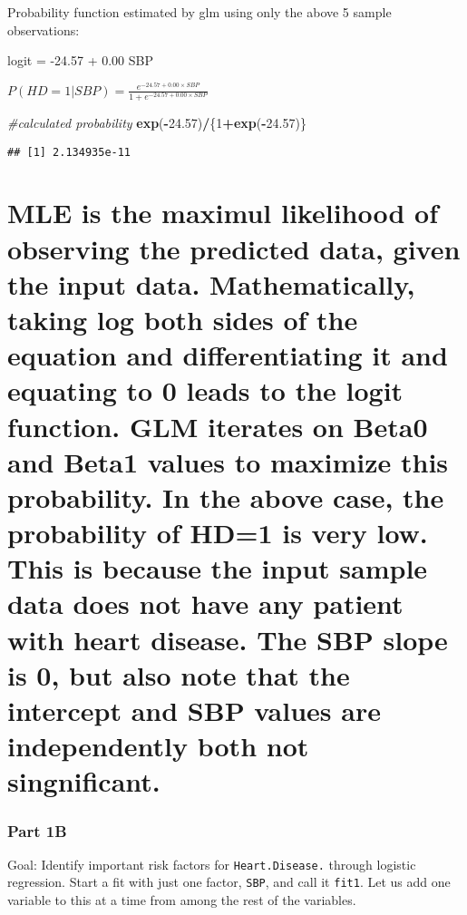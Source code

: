 \documentclass[]{article}
\newenvironment{Shaded}{\begin{snugshade}}{\end{snugshade}}
\newcommand{\KeywordTok}[1]{\textcolor[rgb]{0.13,0.29,0.53}{\textbf{#1}}}
\newcommand{\DecValTok}[1]{\textcolor[rgb]{0.00,0.00,0.81}{#1}}
\newcommand{\FloatTok}[1]{\textcolor[rgb]{0.00,0.00,0.81}{#1}}
\newcommand{\CommentTok}[1]{\textcolor[rgb]{0.56,0.35,0.01}{\textit{#1}}}
\newcommand{\OperatorTok}[1]{\textcolor[rgb]{0.81,0.36,0.00}{\textbf{#1}}}
\newcommand{\NormalTok}[1]{#1}
\begin{document}
Probability function estimated by glm using only the above 5 sample
observations:

logit = -24.57 + 0.00 SBP

\(P(HD = 1 \vert SBP) = \frac{e^{-24.57+0.00 \times SBP}}{1+e^{-24.57+0.00 \times SBP}}\)

\begin{Shaded}
\begin{Highlighting}[]
\CommentTok{#calculated probability}
\KeywordTok{exp}\NormalTok{(}\OperatorTok{-}\FloatTok{24.57}\NormalTok{)}\OperatorTok{/}\NormalTok{\{}\DecValTok{1}\OperatorTok{+}\KeywordTok{exp}\NormalTok{(}\OperatorTok{-}\FloatTok{24.57}\NormalTok{)\}}
\end{Highlighting}
\end{Shaded}

\begin{verbatim}
## [1] 2.134935e-11
\end{verbatim}

\section{MLE is the maximul likelihood of observing the predicted data,
given the input data. Mathematically, taking log both sides of the
equation and differentiating it and equating to 0 leads to the logit
function. GLM iterates on Beta0 and Beta1 values to maximize this
probability. In the above case, the probability of HD=1 is very low.
This is because the input sample data does not have any patient with
heart disease. The SBP slope is 0, but also note that the intercept and
SBP values are independently both not
singnificant.}\label{mle-is-the-maximul-likelihood-of-observing-the-predicted-data-given-the-input-data.-mathematically-taking-log-both-sides-of-the-equation-and-differentiating-it-and-equating-to-0-leads-to-the-logit-function.-glm-iterates-on-beta0-and-beta1-values-to-maximize-this-probability.-in-the-above-case-the-probability-of-hd1-is-very-low.-this-is-because-the-input-sample-data-does-not-have-any-patient-with-heart-disease.-the-sbp-slope-is-0-but-also-note-that-the-intercept-and-sbp-values-are-independently-both-not-singnificant.}

\subsubsection{Part 1B}\label{part-1b}

Goal: Identify important risk factors for \texttt{Heart.Disease.}
through logistic regression. Start a fit with just one factor,
\texttt{SBP}, and call it \texttt{fit1}. Let us add one variable to this
at a time from among the rest of the variables.
\end{document}
